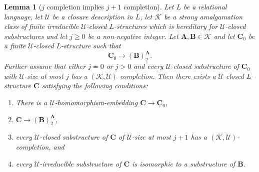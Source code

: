 \documentclass{elsarticle}
\def\str#1{\mathbf {#1}}
\def\K{{\mathcal K}}
\theoremstyle{plain}
\newtheorem{lemma}[theorem]{Lemma}
\theoremstyle{definition}
\theoremstyle{remark}
\begin{document}
\begin{lemma}[$j$ completion implies $j+1$ completion]
\label{lem:iteratedpartitestep2}
Let $L$ be a relational language, let $\mathcal U$ be a closure description in $L$, let $\mathcal K$ be a strong amalgamation class of finite irreducible $\mathcal U$-closed
$L$-structures which is hereditary for $\mathcal U$-closed substructures and let $j\geq 0$ be a non-negative integer.
Let $\str{A},\str{B}\in \mathcal K$
and let $\str{C}_0$ be a finite $\mathcal U$-closed $L$-structure such that $$\str{C}_0 \longrightarrow (\str{B})^{\str{A}}_2.$$
Further assume that either $j=0$ or $j>0$ and every $\mathcal U$-closed substructure of $\str{C}_0$ with $\mathcal U$-size at most $j$ has a $(\K,\mathcal U)$-completion. 
Then there exists a $\mathcal U$-closed $L$-structure $\str{C}$ satisfying the following conditions:
\begin{enumerate}[itemsep=0em]
\item There is a $\mathcal U$-homo{\-}morphism-embedding $\str{C}\to \str{C}_0$,
\item $\str{C} \longrightarrow (\str{B})^{\str{A}}_2$,
\item every $\mathcal U$-closed substructure of $\str{C}$ of $\mathcal U$-size at most $j+1$ has a $(\K,\mathcal U)$-completion, and
\item every $\mathcal U$-irreducible substructure of $\str{C}$ is isomorphic to a substructure of $\str{B}$. 
\end{enumerate}
\end{lemma}
\end{document}
